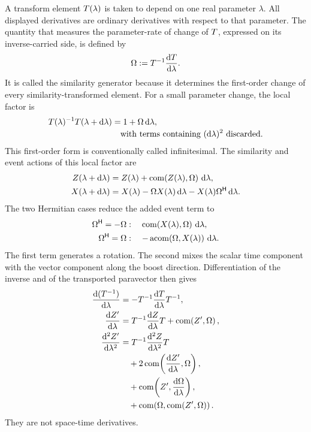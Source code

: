 A transform element \(T(\lambda)\) is taken to depend on one real
parameter \(\lambda\). All displayed derivatives are ordinary derivatives
with respect to that parameter. The quantity that measures the
parameter-rate of change of \(T\), expressed on its inverse-carried
side, is defined by
\begin{equation}
\Omega:=T^{-1}\frac{\mathrm dT}{\mathrm d\lambda}.
\label{eq:similarity-generator}
\end{equation}
It is called the similarity generator because it determines the
first-order change of every similarity-transformed element.
For a small parameter change, the local factor is
\begin{align*}
\pv{T}(\lambda)^{-1}\pv{T}(\lambda+\dd\lambda)
&=1+\pv{\Omega}\,\dd\lambda,\\[-0.2em]
&\quad\text{with terms containing }(\dd\lambda)^2\text{ discarded}.
\end{align*}
This first-order form is conventionally called infinitesimal. The
similarity and event actions of this local factor are
\begin{align*}
Z(\lambda+\mathrm d\lambda)
&=Z(\lambda)
+\operatorname{com}\!\left(Z(\lambda),\Omega\right)\,\mathrm d\lambda,\\
X(\lambda+\mathrm d\lambda)
&=X(\lambda)-\Omega X(\lambda)\,\mathrm d\lambda
-X(\lambda)\Omega^{\mathsf H}\,\mathrm d\lambda.
\end{align*}
The two Hermitian cases reduce the added event term to
\begin{align*}
\Omega^{\mathsf H}=-\Omega
&:\quad \operatorname{com}\!\left(X(\lambda),\Omega\right)\,\mathrm d\lambda,\\
\Omega^{\mathsf H}=\Omega
&:\quad -\operatorname{acom}\!\left(\Omega,X(\lambda)\right)\,\mathrm d\lambda.
\end{align*}
The first term generates a rotation. The second mixes the scalar time
component with the vector component along the boost direction.
Differentiation of the inverse and of the transported paravector then gives
\begin{align*}
\frac{\mathrm d(T^{-1})}{\mathrm d\lambda}
&=-T^{-1}\frac{\mathrm dT}{\mathrm d\lambda}T^{-1},\\
\frac{\mathrm dZ'}{\mathrm d\lambda} &=
T^{-1}\frac{\mathrm dZ}{\mathrm d\lambda}T
+\operatorname{com}\!\left(Z',\Omega\right),\notag \\
\frac{\mathrm d^2Z'}{\mathrm d\lambda^2} &=
T^{-1}\frac{\mathrm d^2Z}{\mathrm d\lambda^2}T\notag \\
&\quad +2\operatorname{com}\!\left(\dfrac{\mathrm dZ'}{\mathrm d\lambda},\Omega\right),\notag \\
&\quad +\operatorname{com}\!\left(Z',\dfrac{\mathrm d\Omega}{\mathrm d\lambda}\right),\notag \\
&\quad +\operatorname{com}\!\left(\Omega,\operatorname{com}\!\left(Z',\Omega\right)\right).
\end{align*}
They are not space-time derivatives.

